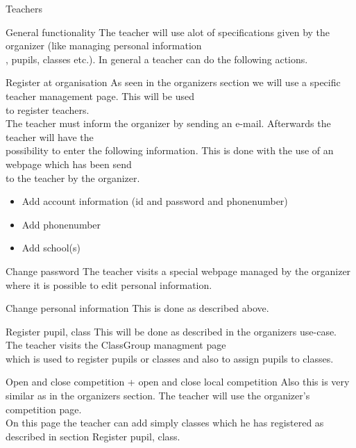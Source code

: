 \begin{section}{Teachers}
    \begin{subsection}{General functionality}
	The teacher will use alot of specifications given by the organizer (like managing personal information\\
	, pupils, classes etc.). In general a teacher can do the following actions.\\
	\begin{subsubsection}{Register at organisation}
	As seen in the organizers section we will use a specific teacher management page. This will be used\\
	to register teachers.\\
	The teacher must inform the organizer by sending an e-mail. Afterwards the teacher will have the\\
	possibility to enter the following information. This is done with the use of an webpage which has been send\\
	to the teacher by the organizer.
	\begin{itemize}
		\item Add account information (id and password and phonenumber)
		\item Add phonenumber
		\item Add school(s)
	\end{itemize}
	\end{subsubsection}
	\begin{subsubsection}{Change password}
	The teacher visits a special webpage managed by the organizer where it is possible to edit personal information.
	\end{subsubsection}
    \begin{subsubsection}{Change personal information}
	This is done as described above.
	\end{subsubsection}
	\begin{subsubsection}{Register pupil, class}
	This will be done as described in the organizers use-case. The teacher visits the ClassGroup managment page\\
	which is used to register pupils or classes and also to assign pupils to classes.
	\end{subsubsection}
	\begin{subsubsection}{Open and close competition + open and close local competition}
	Also this is very similar as in the organizers section. The teacher will use the organizer's competition page.\\
	On this page the teacher can add simply classes which he has registered as described in section Register pupil, class.\\

\end{subsubsection}
\end{subsection}
\end{section}
